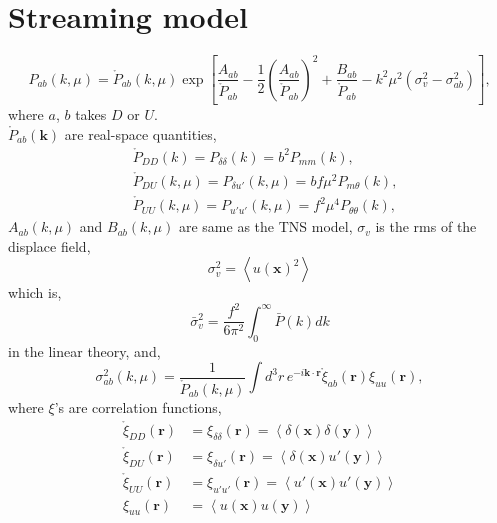 \documentclass[a4paper,11pt, fleqn]{article}
\begin{document}
%
%
\newpage
\section{Streaming model}
\vspace{-5mm}

\begin{equation}
  P_{ab}(k, \mu) = \mathring{P}_{ab}(k, \mu) \exp \left[
    \frac{A_{ab}}{\mathring{P}_{ab}}
    - \frac{1}{2} \left( \frac{A_{ab}}{\mathring{P}_{ab}} \right)^2
    + \frac{B_{ab}}{\mathring{P}_{ab}} - k^2 \mu^2 (\sigma_v^2 - \sigma_{ab}^2)
    \right],
\end{equation}
%
where $a$, $b$ takes $D$ or $U$.\\

$\mathring{P}_{ab}(\bm{k})$ are real-space quantities,
%
\begin{align}
  &\mathring{P}_{DD}(k) = P_{\delta\delta}(k) = b^2 P_{mm}(k),\\
  &\mathring{P}_{DU}(k, \mu) = P_{\delta u'}(k, \mu) = b f\mu^2 P_{m\theta}(k),\\
  &\mathring{P}_{UU}(k, \mu) = P_{u'u'}(k, \mu) = f^2\mu^4 P_{\theta\theta}(k),
\end{align}
%
$A_{ab}(k, \mu)$ and $B_{ab}(k, \mu)$ are same as the TNS model,
$\sigma_v$ is the rms of the displace field,
%
\begin{equation}
  \sigma_v^2 = \left\langle u(\bm{x})^2 \right\rangle
\end{equation}
%
which is,
%
\begin{equation}
  \bar{\sigma}_v^2 = \frac{f^2}{6\pi^2} \int_0^\infty \!\! \bar{P}(k) dk
\end{equation}
in the linear theory, and,
%
\begin{equation}
  \sigma_{ab}^2(k, \mu) = \frac{1}{\mathring{P}_{ab}(k, \mu)}
  \int \!\! d^3 r \, e^{-i\bm{k}\cdot\bm{r}} 
  \mathring{\xi}_{ab}(\bm{r}) \xi_{uu}(\bm{r}),
\end{equation}
%
where $\xi$'s are correlation functions,
%
\begin{align}
  \mathring{\xi}_{DD}(\bm{r}) &= \xi_{\delta\delta}(\bm{r}) = \left\langle
  \delta(\bm{x}) \delta(\bm{y}) \right\rangle\\
  \mathring{\xi}_{DU}(\bm{r}) &= \xi_{\delta u'}(\bm{r}) = \left\langle
  \delta(\bm{x}) u'(\bm{y}) \right\rangle\\
  \mathring{\xi}_{UU}(\bm{r}) &= \xi_{u'u'}(\bm{r}) = \left\langle
  u'(\bm{x}) u'(\bm{y}) \right\rangle\\
  \xi_{uu}(\bm{r}) &= \left\langle
  u(\bm{x}) u(\bm{y}) \right\rangle\\
\end{align}
  
\end{document}
